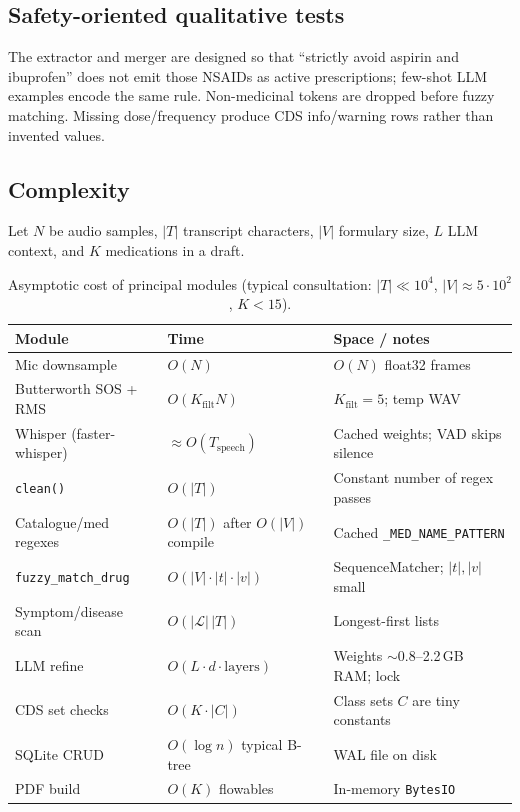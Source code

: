 \documentclass[11pt,a4paper]{article}
\begin{document}
\subsection{Safety-oriented qualitative tests}
The extractor and merger are designed so that ``strictly avoid aspirin and ibuprofen'' does not emit those NSAIDs as active prescriptions; few-shot LLM examples encode the same rule. Non-medicinal tokens are dropped before fuzzy matching. Missing dose/frequency produce CDS info/warning rows rather than invented values.

\subsection{Complexity}
Let $N$ be audio samples, $|T|$ transcript characters, $|V|$ formulary size, $L$ LLM context, and $K$ medications in a draft.

\begin{table}[htbp]
\centering
\caption{Asymptotic cost of principal modules (typical consultation: $|T|\!\ll\!10^4$, $|V|\!\approx\!5\cdot 10^2$, $K\!<\!15$).}
\label{tab:complexity}
\begin{tabular}{@{}llp{6.4cm}@{}}
\toprule
\textbf{Module} & \textbf{Time} & \textbf{Space / notes} \\
\midrule
Mic downsample & $O(N)$ & $O(N)$ float32 frames \\
Butterworth SOS + RMS & $O(K_{\text{filt}} N)$ & $K_{\text{filt}}=5$; temp WAV \\
Whisper (faster-whisper) & $\approx O(T_{\text{speech}})$ & Cached weights; VAD skips silence \\
\texttt{clean()} & $O(|T|)$ & Constant number of regex passes \\
Catalogue/med regexes & $O(|T|)$ after $O(|V|)$ compile & Cached \texttt{\_MED\_NAME\_PATTERN} \\
\texttt{fuzzy\_match\_drug} & $O(|V|\cdot |t|\cdot |v|)$ & SequenceMatcher; $|t|,|v|$ small \\
Symptom/disease scan & $O(|\mathcal{L}|\,|T|)$ & Longest-first lists \\
LLM refine & $O(L \cdot d \cdot \text{layers})$ & Weights $\sim$0.8--2.2\,GB RAM; lock \\
CDS set checks & $O(K\cdot |C|)$ & Class sets $C$ are tiny constants \\
SQLite CRUD & $O(\log n)$ typical B-tree & WAL file on disk \\
PDF build & $O(K)$ flowables & In-memory \texttt{BytesIO} \\
\bottomrule
\end{tabular}
\end{table}
\end{document}
